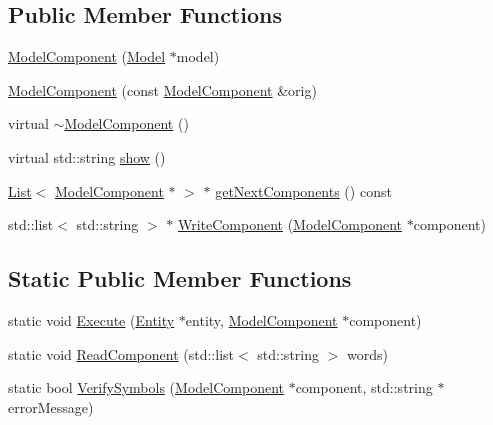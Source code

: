 \subsection*{Public Member Functions}
\begin{DoxyCompactItemize}
\item 
\hyperlink{class_model_component_a1e2b24c3592711a9bd3f131706b7f0c7}{Model\-Component} (\hyperlink{class_model}{Model} $\ast$model)
\item 
\hyperlink{class_model_component_a5b95933e7a265039eb01f6ec88d92675}{Model\-Component} (const \hyperlink{class_model_component}{Model\-Component} \&orig)
\item 
virtual \hyperlink{class_model_component_a6d490d6a2fdf66ad13ed8adcc39ec611}{$\sim$\-Model\-Component} ()
\item 
virtual std\-::string \hyperlink{class_model_component_ad8bc846e36b028eab7efb7da6c549eca}{show} ()
\item 
\hyperlink{class_list}{List}$<$ \hyperlink{class_model_component}{Model\-Component} $\ast$ $>$ $\ast$ \hyperlink{class_model_component_a89fe8e3fb064c68aebbecd36eeed7d43}{get\-Next\-Components} () const 
\item 
std\-::list$<$ std\-::string $>$ $\ast$ \hyperlink{class_model_component_a3bdf3706c49706e674ab13fd9d1d83ed}{Write\-Component} (\hyperlink{class_model_component}{Model\-Component} $\ast$component)
\end{DoxyCompactItemize}
\subsection*{Static Public Member Functions}
\begin{DoxyCompactItemize}
\item 
static void \hyperlink{class_model_component_a08c5312c2f94f6621577cc1836c2d3e0}{Execute} (\hyperlink{class_entity}{Entity} $\ast$entity, \hyperlink{class_model_component}{Model\-Component} $\ast$component)
\item 
static void \hyperlink{class_model_component_a1629e990c010688878b8d378058e8eeb}{Read\-Component} (std\-::list$<$ std\-::string $>$ words)
\item 
static bool \hyperlink{class_model_component_a0798a220cf903b34ce28c40e136d207d}{Verify\-Symbols} (\hyperlink{class_model_component}{Model\-Component} $\ast$component, std\-::string $\ast$error\-Message)
\end{DoxyCompactItemize}
